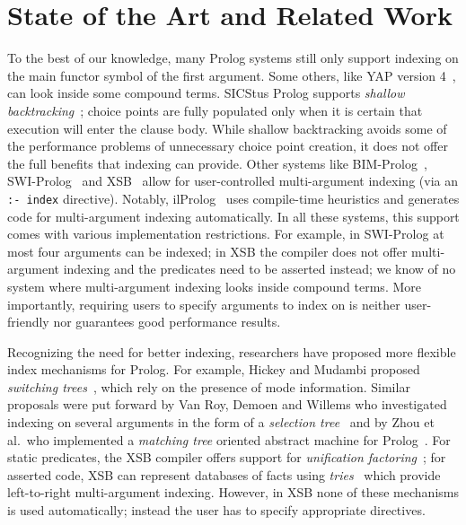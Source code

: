 \documentclass{llncs}
\newcommand{\code}[1]{\texttt{#1}}
\begin{document}
\section{State of the Art and Related Work} \label{sec:related}
To the best of our knowledge, many Prolog systems still only support
indexing on the main functor symbol of the first argument. Some
others, like YAP version 4~\cite{YAP}, can look inside some compound
terms. SICStus Prolog supports \emph{shallow
  backtracking}~\cite{ShallowBacktracking@ICLP-89}; choice points are
fully populated only when it is certain that execution will enter the
clause body. While shallow backtracking avoids some of the performance
problems of unnecessary choice point creation, it does not offer the
full benefits that indexing can provide. Other systems like
BIM-Prolog~\cite{IndexingProlog@NACLP-89}, SWI-Prolog~\cite{SWI} and
XSB~\cite{XSB} allow for user-controlled multi-argument indexing (via
an \code{:-~index} directive). Notably, ilProlog~\cite{ilProlog} uses
compile-time heuristics and generates code for multi-argument indexing
automatically. In all these systems, this support comes with various
implementation restrictions. For example, in SWI-Prolog at most four
arguments can be indexed; in XSB the compiler does not offer
multi-argument indexing and the predicates need to be asserted
instead; we know of no system where multi-argument indexing looks
inside compound terms. More importantly, requiring users to specify
arguments to index on is neither user-friendly nor guarantees good
performance results.

Recognizing the need for better indexing, researchers have proposed
more flexible index mechanisms for Prolog. For example, Hickey and
Mudambi proposed \emph{switching trees}~\cite{HickeyMudambi@JLP-89},
which rely on the presence of mode information. Similar proposals were
put forward by Van Roy, Demoen and Willems who investigated indexing
on several arguments in the form of a \emph{selection tree}~\cite{VRDW87}
and by Zhou et al.\ who implemented a \emph{matching tree} oriented
abstract machine for Prolog~\cite{TOAM@ICLP-90}. For static
predicates, the XSB compiler offers support for \emph{unification
factoring}~\cite{UnifFact@POPL-95}; for asserted code, XSB can
represent databases of facts using \emph{tries}~\cite{Tries@JLP-99}
which provide left-to-right multi-argument indexing. However, in XSB
none of these mechanisms is used automatically; instead the user has
to specify appropriate directives.
\end{document}
